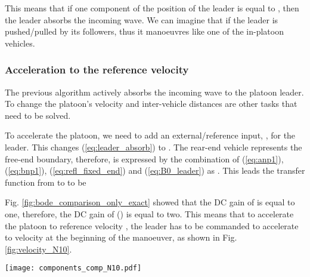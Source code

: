 \documentclass[final,5p,times,twocolumn]{elsarticle}
\begin{document}
This means that if one component of the position of the leader is equal to , then the leader absorbs the incoming wave. We can imagine that if the leader is pushed/pulled by its followers, thus it manoeuvres like one of the in-platoon vehicles.

\subsubsection{Acceleration to the reference velocity}
\label{subsec:acceleration_platoon}

The previous algorithm actively absorbs the incoming wave to the platoon leader. To change the platoon's velocity and inter-vehicle distances are other tasks that need to be solved.

To accelerate the platoon, we need to add an external/reference input, , for the leader. This changes (\ref{eq:leader_absorb}) to . The rear-end vehicle represents the free-end boundary, therefore,  is expressed by the combination of (\ref{eq:anp1}), (\ref{eq:bnp1}), (\ref{eq:refl_fixed_end}) and (\ref{eq:B0_leader}) as . This leads the transfer function from  to  to be

Fig. \ref{fig:bode_comparison_only_exact} showed that the DC gain of  is equal to one, therefore, the DC gain of () is equal to two. This means that to accelerate the platoon to reference velocity , the leader has to be commanded to accelerate to velocity  at the beginning of the manoeuver, as shown in Fig. \ref{fig:velocity_N10}.

\begin{figure*}[htb]\centering
\texttt{[image: components\_comp\_N10.pdf]}
  \caption{Simulation of the velocity wave propagating in the platoon with the Front-sided wave-absorbing controller at several time instances. At the beginning, , all platoon vehicles are standing still except for the leader which accelerates to a velocity . At intermediate times, the wave travels to the rear vehicle, where it is reflected and travels back to the leader to be completely absorbed. By propagating, it forces platoon vehicles to accelerate by another  to a velocity . At the final stage, , the leader is the last one reaching the velocity  and the whole platoon moves with . The red crosses represent the derivation of  positional components computed by the wave transfer function approach, the green plus signs are the velocities simulated by the Matlab Simulink.}
  \label{fig:velocity_N10}
\end{figure*}
\end{document}
